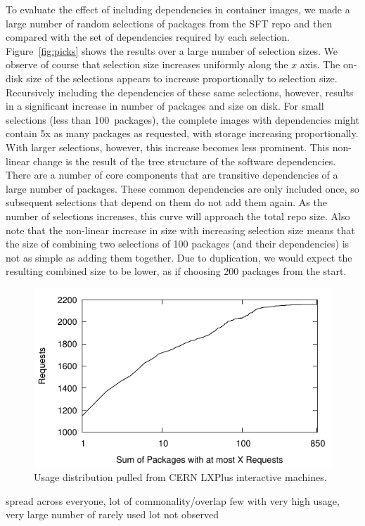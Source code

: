 \documentclass[sigconf]{acmart}
\begin{document}
To evaluate the effect of including dependencies in container images,
we made a large number of random selections of packages from the SFT repo and then compared with the set of dependencies required by each selection.
Figure~\ref{fig:picks} shows the results over a large number of selection sizes.
We observe of course that selection size increases uniformly along the $x$ axis.
The on-disk size of the selections appears to increase proportionally to selection size.
Recursively including the dependencies of these same selections,
however, results in a significant increase in number of packages and size on disk.
For small selections (less than 100~packages),
the complete images with dependencies might contain 5x as many packages as requested,
with storage increasing proportionally.
With larger selections, however,
this increase becomes less prominent.
This non-linear change is the result of the tree structure of the software dependencies.
There are a number of core components that are transitive dependencies of a large number of packages.
These common dependencies are only included once,
so subsequent selections that depend on them do not add them again.
As the number of selections increases,
this curve will approach the total repo size.
Also note that the non-linear increase in size with increasing selection size means that the size of combining two selections of 100 packages (and their dependencies) is not as simple as adding them together.
Due to duplication, we would expect the resulting combined size to be lower,
as if choosing 200 packages from the start.

\begin{figure}
    \includegraphics[width=\linewidth]{curated/lxplus_dist/usage_distribution_cdf.pdf}
    \caption{Usage distribution pulled from CERN LXPlus interactive machines.}
    \label{fig:usage_distribution}
\end{figure}
spread across everyone, lot of commonality/overlap
few with very high usage, very large number of rarely used
lot not observed
\fi
\end{document}
